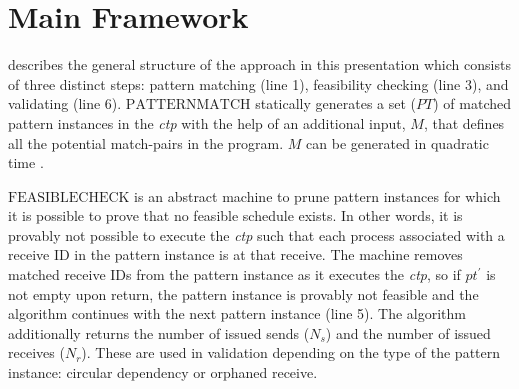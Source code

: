 \section{Main Framework}


 describes the general structure of the approach in this presentation which consists of three distinct steps: pattern matching (line 1), feasibility checking (line 3), and validating (line 6). $\mathrm{PATTERNMATCH}$ statically generates a set ($\mathit{PT}$) of matched pattern instances in the \emph{ctp} with the help of an additional input, $M$, that defines all the potential match-pairs in the program. $M$ can be generated in quadratic time \cite{DBLP:conf/kbse/HuangMM13}. 

$\mathrm{FEASIBLECHECK}$ is an abstract machine to prune pattern instances for which it is possible to prove that no feasible schedule exists. In other words, it is provably not possible to execute the \emph{ctp} such that each process associated with a receive ID in the pattern instance is at that receive. The machine removes matched receive IDs from the pattern instance as it executes the \emph{ctp}, so if $\mathit{pt^\prime}$ is not empty upon return, the pattern instance is provably not feasible and the algorithm continues with the next pattern instance (line 5). The algorithm additionally returns the number of issued sends ($\mathit{N_s}$) and the number of issued receives ($\mathit{N_r}$). These are used in validation depending on the type of the pattern instance: circular dependency or orphaned receive.



